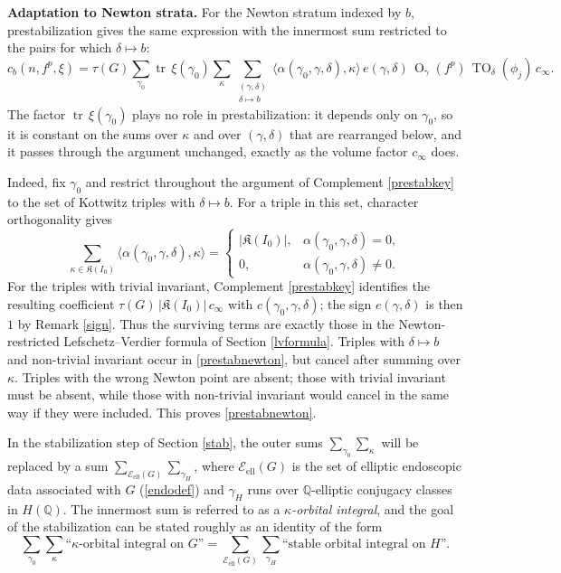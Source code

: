 \documentclass[11pt,a4paper]{article}
\newcommand{\Eell}{\mathcal{E}_{\mathrm{ell}}}
\theoremstyle{definition}
\theoremstyle{plain}
\theoremstyle{remark}
\theoremstyle{plain}
\DeclareMathOperator{\tr}{tr}
\DeclareMathOperator{\Or}{O}
\DeclareMathOperator{\TO}{TO}
\begin{document}
\textbf{Adaptation to Newton strata.}
For the Newton stratum indexed by $b$, prestabilization gives the same expression with the innermost sum restricted to the pairs for which $\delta \mapsto b$:
\begin{equation}\label{prestabnewton}
    c_b(n,f^p,\xi) = \tau(G) \sum_{\gamma_0} \tr\,\xi(\gamma_0) \sum_{\kappa} \sum_{\substack{(\gamma, \delta) \\ \delta \mapsto b}} \langle \alpha(\gamma_0, \gamma, \delta), \kappa \rangle \, e(\gamma, \delta) \, \Or_\gamma (f^p) \, \TO_{\delta} (\phi_j) \, c_{\infty}.
\end{equation}
The factor $\tr\,\xi(\gamma_0)$ plays no role in prestabilization: it depends only on $\gamma_0$, so it is constant on the sums over $\kappa$ and over $(\gamma,\delta)$ that are rearranged below, and it passes through the argument unchanged, exactly as the volume factor $c_{\infty}$ does.

Indeed, fix $\gamma_0$ and restrict throughout the argument of Complement \ref{prestabkey} to the set of Kottwitz triples with $\delta \mapsto b$. For a triple in this set, character orthogonality gives
$$
    \sum_{\kappa \in \mathfrak{K}(I_0)} \langle \alpha(\gamma_0,\gamma,\delta),\kappa \rangle
    =
    \begin{cases}
        \lvert \mathfrak{K}(I_0) \rvert, & \alpha(\gamma_0,\gamma,\delta)=0,\\
        0, & \alpha(\gamma_0,\gamma,\delta)\neq 0.
    \end{cases}
$$
For the triples with trivial invariant, Complement \ref{prestabkey} identifies the resulting coefficient $\tau(G)\,\lvert \mathfrak{K}(I_0) \rvert\,c_{\infty}$ with $c(\gamma_0,\gamma,\delta)$; the sign $e(\gamma,\delta)$ is then $1$ by Remark \ref{sign}. Thus the surviving terms are exactly those in the Newton-restricted Lefschetz--Verdier formula of Section \ref{lvformula}. Triples with $\delta \mapsto b$ and non-trivial invariant occur in \eqref{prestabnewton}, but cancel after summing over $\kappa$. Triples with the wrong Newton point are absent; those with trivial invariant must be absent, while those with non-trivial invariant would cancel in the same way if they were included. This proves \eqref{prestabnewton}.

In the stabilization step of Section \ref{stab}, the outer sums $\sum_{\gamma_0} \sum_{\kappa}$ will be replaced by a sum $\sum_{\Eell(G)} \sum_{\gamma_H}$, where $\Eell(G)$ is the set of elliptic endoscopic data associated with $G$ (\ref{endodef}) and $\gamma_H$ runs over $\mathbb{Q}$-elliptic conjugacy classes in $H(\mathbb{Q})$. The innermost sum is referred to as a \textit{$\kappa$-orbital integral}, and the goal of the stabilization can be stated roughly as an identity of the form
$$ \sum_{\gamma_0} \sum_{\kappa} \text{``$\kappa$-orbital integral on } G \text{''} = \sum_{\Eell(G)} \sum_{\gamma_H} \text{``stable orbital integral on }H \text{''}.$$
\end{document}
